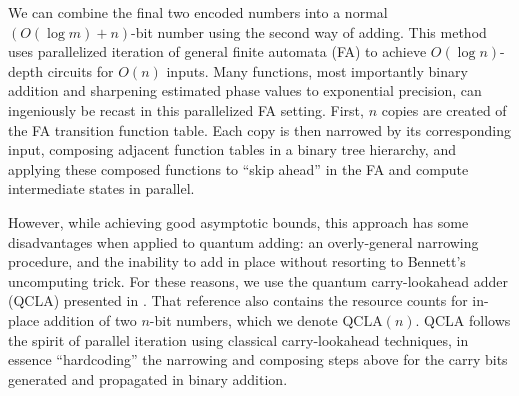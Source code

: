 We can combine the final two encoded numbers
into a normal $(O(\log m) + n)$-bit number using the second way of adding.
This method uses parallelized
iteration of general finite automata (FA) to achieve $O(\log n)$-depth circuits
for $O(n)$ inputs. Many functions, most importantly binary
addition and sharpening estimated phase values to exponential precision,
can ingeniously be recast in this parallelized FA setting.
First, $n$ copies are created of the FA
transition function table. Each copy is then narrowed by its corresponding
input,
composing adjacent function tables in a binary tree hierarchy, and applying
these composed functions to ``skip ahead'' in the FA and compute
intermediate states in parallel.

However, while achieving good asymptotic bounds, this approach has some
disadvantages when applied to quantum adding: an overly-general narrowing
procedure, and the inability to add in place without resorting to
Bennett's uncomputing trick.
For these reasons, we use the quantum carry-lookahead
adder (QCLA) presented in \cite{dkrs04}. That reference also contains the
resource counts for in-place addition of two $n$-bit numbers, which 
we denote $\text{QCLA}(n)$.
QCLA follows the spirit of parallel iteration
using classical carry-lookahead techniques, in essence ``hardcoding''
the narrowing and composing steps above for the carry bits generated
and propagated in binary addition.






